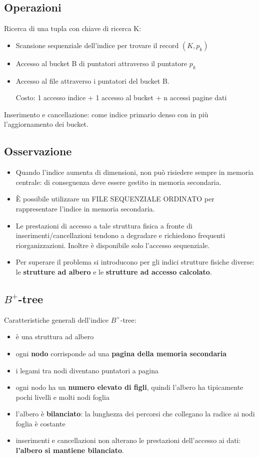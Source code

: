 \documentclass[a4paper, 10pt]{article}
\theoremstyle{definition}
\begin{document}
		\subsection*{Operazioni}
		Ricerca di una tupla con chiave di ricerca K:
		\begin{itemize}
			\item Scansione	sequenziale dell'indice per trovare il record $ (K, p_k ) $
			\item Accesso al bucket B di puntatori attraverso il puntatore $ p_k $
			\item Accesso al file attraverso i puntatori del bucket B.
			
			Costo: 1 accesso indice + 1 accesso al bucket + n accessi pagine dati
		\end{itemize}
		Inserimento e cancellazione: come indice primario denso con in più l'aggiornamento dei bucket.
		
		\subsection*{Osservazione}
		\begin{itemize}
			\item Quando l'indice aumenta di dimensioni, non può
			risiedere sempre in memoria centrale: di conseguenza
			deve essere gestito in memoria secondaria.
			\item È possibile utilizzare un FILE SEQUENZIALE
			ORDINATO per rappresentare l'indice in memoria secondaria.
			\item Le prestazioni di accesso a tale struttura fisica a fronte di
			inserimenti/cancellazioni tendono a degradare e
			richiedono frequenti riorganizzazioni. Inoltre è
			disponibile solo l'accesso sequenziale.
			\item Per superare il problema si introducono per gli indici
			strutture fisiche diverse: le \textbf{strutture ad albero} e le
			\textbf{strutture ad accesso calcolato}.
		\end{itemize}
		
	\newpage
		
	\subsection{$B^+$-tree}
	Caratteristiche generali dell'indice $ B^+ $-tree:
	\begin{itemize}
		\item è una struttura ad albero
		\item ogni \textbf{nodo} corrisponde ad una \textbf{pagina della memoria
		secondaria}
		\item i legami tra nodi diventano puntatori a pagina
		\item ogni nodo ha un \textbf{numero elevato di figli}, quindi l'albero
		ha tipicamente pochi livelli e molti nodi foglia
		\item l'albero è \textbf{bilanciato}: la lunghezza dei percorsi che
		collegano la radice ai nodi foglia è costante
		\item inserimenti e cancellazioni non alterano le prestazioni
		dell'accesso ai dati: \textbf{l'albero si mantiene bilanciato}.
	\end{itemize}
	
\end{document}
